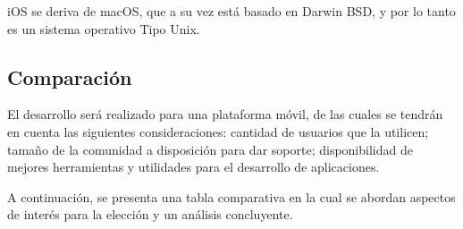             \par iOS se deriva de macOS, que a su vez está basado en Darwin BSD, y por lo tanto es un sistema operativo Tipo Unix.
            
    \subsection{Comparación}
        \par El desarrollo será realizado para una plataforma móvil, de las cuales se tendrán en cuenta las siguientes consideraciones: cantidad de usuarios que la utilicen; tamaño de la comunidad a disposición para dar soporte; disponibilidad de mejores herramientas y utilidades para el desarrollo de aplicaciones.
        
        \par A continuación, se presenta una tabla comparativa en la cual se abordan aspectos de interés para la elección y un análisis concluyente.
        
